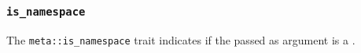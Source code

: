 
\subsubsection{\texttt{is\_namespace}}

The \texttt{meta::is\_namespace}
trait indicates if the  passed as argument is a .


